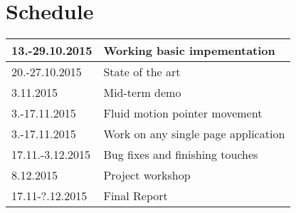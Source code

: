 \documentclass[12pt,a4paper,english,oneside]{article}
\begin{document}
\section{Schedule}

\begin{tabular}{|p{30mm}|p{120mm}|}
  \hline
  13.-29.10.2015      & Working basic impementation \\ \hline
  20.-27.10.2015      & State of the art \\ \hline
  3.11.2015           & Mid-term demo \\ \hline
  3.-17.11.2015       & Fluid motion pointer movement \\ \hline
  3.-17.11.2015       & Work on any single page application \\ \hline
  17.11.-3.12.2015    & Bug fixes and finishing touches \\ \hline
  8.12.2015           & Project workshop \\ \hline
  17.11-?.12.2015     & Final Report \\ \hline
\end{tabular}






\end{document}
